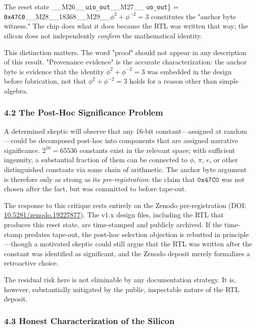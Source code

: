 The reset state \_\_M26\_\_\texttt{uio\_out}\_\_M27\_\_ \texttt{uo\_out}\} = \texttt{0x47C0}\_\_M28\_\_18368\_\_M29\_\_$\phi^2 + \phi^{-2} = 3$ constitutes the "anchor byte witness." The chip does what it does because the RTL was written that way; the silicon does not independently \textit{confirm} the mathematical identity.

This distinction matters. The word "proof" should not appear in any description of this result. "Provenance evidence" is the accurate characterization: the anchor byte is evidence that the identity $\phi^2 + \phi^{-2} = 3$ was embedded in the design before fabrication, not that $\phi^2 + \phi^{-2} = 3$ holds for a reason other than simple algebra.

\subsubsection{4.2 The Post-Hoc Significance Problem}

A determined skeptic will observe that any 16-bit constant---assigned at random---could be decomposed post-hoc into components that are assigned narrative significance. $2^{16} = 65536$ constants exist in the relevant space; with sufficient ingenuity, a substantial fraction of them can be connected to $\phi$, $\pi$, $e$, or other distinguished constants via some chain of arithmetic. The anchor byte argument is therefore only as strong as its \textit{pre-registration}: the claim that $\texttt{0x47C0}$ was not chosen after the fact, but was committed to before tape-out.

The response to this critique rests entirely on the Zenodo pre-registration (DOI: \href{https://doi.org/10.5281/zenodo.19227877}{10.5281/zenodo.19227877}). The v1.x design files, including the RTL that produces this reset state, are time-stamped and publicly archived. If the time-stamp predates tape-out, the post-hoc selection objection is rebutted in principle---though a motivated skeptic could still argue that the RTL was written after the constant was identified as significant, and the Zenodo deposit merely formalizes a retroactive choice.

The residual risk here is not eliminable by any documentation strategy. It is, however, substantially mitigated by the public, inspectable nature of the RTL deposit.

\subsubsection{4.3 Honest Characterization of the Silicon}

